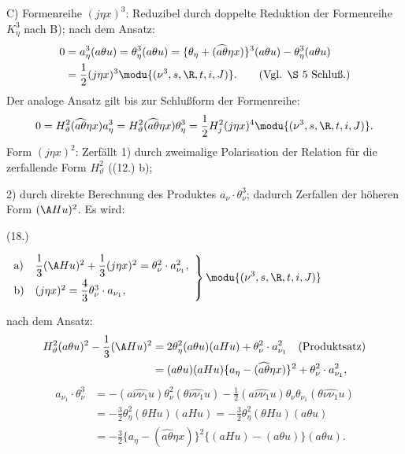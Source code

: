 \noindent C) Formenreihe $(j\eta x)^3$: Reduzibel durch doppelte Reduktion der Formenreihe $K_\eta^3$ nach B); nach dem Ansatz:
\[
\begin{aligned}
0&=a_\eta^3(a\theta u)=\theta_\eta^3(a\theta u)
=\{\theta_\eta+(\widehat{a\theta}\eta x)\}^3(a\theta u)-\theta_\eta^3(a\theta u)\\
&=\frac12(j\eta x)^3\modu{(\nu^3,s,\R,t,i,J)}.\qquad(\text{Vgl. \S\ 5 Schluß.})
\end{aligned}
\]
Der analoge Ansatz gilt bis zur Schlußform der Formenreihe:
\[
0=H_\vartheta^2(\widehat{a\theta}\eta x)a_\eta^3
=H_\vartheta^2(\widehat{a\theta}\eta x)\theta_\eta^3=\frac12H_j^2(j\eta x)^4\modu{(\nu^3,s,\R,t,i,J)}.
\]
Form $(j\eta x)^2$: Zerfällt 1) durch zweimalige Polarisation der Relation für die zerfallende Form $H_\vartheta^2$ ((12.) b);

2) durch direkte Berechnung des Produktes $a_\nu\cdot\theta_\nu^3$; dadurch Zerfallen der höheren Form $(\A Hu)^2$. Es wird:
\par\smallskip\noindent
\begin{minipage}[c]{4.8em}
\centering (18.)
\end{minipage}%
\begin{minipage}[c]{\dimexpr\linewidth-4.8em\relax}
\centering
\(\displaystyle
\left.\begin{array}{ll}
\text{a)}&\dfrac13(\A Hu)^2+\dfrac13(j\eta x)^2=\theta_\nu^2\cdot a_{\nu_1}^2,\\[0.6em]
\text{b)}&(j\eta x)^2=\dfrac43\theta_\nu^3\cdot a_{\nu_1},
\end{array}\right\}\modu{(\nu^3,s,\R,t,i,J)}
\)
\end{minipage}
\par\smallskip
nach dem Ansatz:
\[
\begin{aligned}
H_\vartheta^2(a\theta u)^2-\frac13(\A Hu)^2
&=2\theta_\eta^2(a\theta u)(aHu)+\theta_\nu^2\cdot a_{\nu_1}^2\quad(\text{Produktsatz})\\
&=(a\theta u)(aHu)\{a_\eta-(\widehat{a\theta}\eta x)\}^2+\theta_\nu^2\cdot a_{\nu_1}^2,
\end{aligned}
\]
\[
\begin{aligned}
a_{\nu_1}\cdot\theta_\nu^3
&=-(a\widehat{\nu\nu_1}u)\theta_\nu^2(\theta\widehat{\nu\nu_1}u)-\frac12(a\widehat{\nu\nu_1}u)\theta_\nu\theta_{\nu_1}(\theta\widehat{\nu\nu_1}u)\\
&=-\frac32\theta_\eta^2(\theta Hu)(aHu)=-\frac32\theta_\eta^2(\theta Hu)(a\theta u)\\
&=-\frac32\{a_\eta-(\widehat{a\theta}\eta x)\}^2\{(aHu)-(a\theta u)\}(a\theta u).
\end{aligned}
\]

